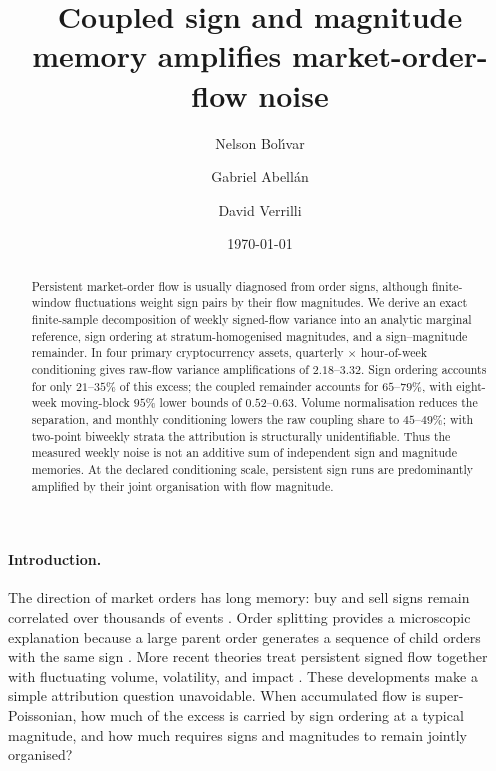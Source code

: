 \documentclass[aps,prl,twocolumn,superscriptaddress,floatfix,nofootinbib]{revtex4-2}
\begin{document}
\title{Coupled sign and magnitude memory amplifies market-order-flow noise}

\author{Nelson Bol\'{\i}var}
\author{Gabriel Abell\'an}
\author{David Verrilli}

\date{\today}

\begin{abstract}
Persistent market-order flow is usually diagnosed from order signs, although
finite-window fluctuations weight sign pairs by their flow magnitudes.  We
derive an exact finite-sample decomposition of weekly signed-flow variance into
an analytic marginal reference, sign ordering at stratum-homogenised
magnitudes, and a sign--magnitude remainder.  In four primary cryptocurrency
assets, quarterly $\times$ hour-of-week conditioning gives raw-flow variance
amplifications of $2.18$--$3.32$.  Sign ordering accounts for only
$21$--$35\%$ of this excess; the coupled remainder accounts for
$65$--$79\%$, with eight-week moving-block $95\%$ lower bounds of
$0.52$--$0.63$.  Volume normalisation reduces the separation, and monthly
conditioning lowers the raw coupling share to $45$--$49\%$; with two-point
biweekly strata the attribution is structurally unidentifiable.  Thus the
measured weekly noise is not an additive sum of independent sign and magnitude
memories.  At the declared conditioning scale, persistent sign runs are
predominantly amplified by their joint organisation with flow magnitude.
\end{abstract}

\maketitle

\paragraph*{Introduction.}
The direction of market orders has long memory: buy and sell signs remain
correlated over thousands of events \cite{lillo2004,bouchaud2004}.  Order
splitting provides a microscopic explanation because a large parent order
generates a sequence of child orders with the same sign
\cite{lillo2005,sato2023prl,sato2023prr}.  More recent theories treat persistent
signed flow together with fluctuating volume, volatility, and impact
\cite{maitrier2026,muhlekarbe2026}.  These developments make a simple
attribution question unavoidable.  When accumulated flow is super-Poissonian,
how much of the excess is carried by sign ordering at a typical magnitude, and
how much requires signs and magnitudes to remain jointly organised?
\end{document}
